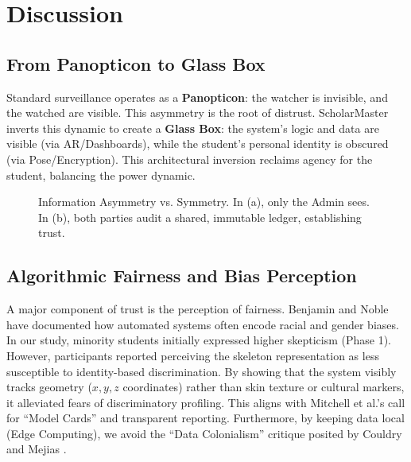 \documentclass[conference]{IEEEtran}
\begin{document}
\section{Discussion}

\subsection{From Panopticon to Glass Box}
Standard surveillance operates as a \textbf{Panopticon}: the watcher is invisible, and the watched are visible. This asymmetry is the root of distrust.
ScholarMaster inverts this dynamic to create a \textbf{Glass Box}: the system's logic and data are visible (via AR/Dashboards), while the student's personal identity is obscured (via Pose/Encryption). This architectural inversion reclaims agency for the student, balancing the power dynamic.

\begin{figure}[htbp]
\centering
{}
\caption{Information Asymmetry vs. Symmetry. In (a), only the Admin sees. In (b), both parties audit a shared, immutable ledger, establishing trust.}
\label{fig:symmetry}
\end{figure}

\subsection{Algorithmic Fairness and Bias Perception}
A major component of trust is the perception of fairness. Benjamin \cite{b15} and Noble \cite{b16} have documented how automated systems often encode racial and gender biases. In our study, minority students initially expressed higher skepticism (Phase 1). However, participants reported perceiving the skeleton representation as less susceptible to identity-based discrimination. By showing that the system visibly tracks geometry ($x,y,z$ coordinates) rather than skin texture or cultural markers, it alleviated fears of discriminatory profiling. This aligns with Mitchell et al.'s \cite{b17} call for ``Model Cards'' and transparent reporting. Furthermore, by keeping data local (Edge Computing), we avoid the ``Data Colonialism'' critique posited by Couldry and Mejias \cite{b18}.
\end{document}
